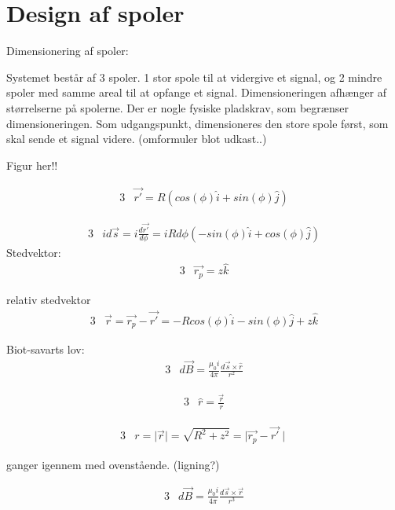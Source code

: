 \section{Design af spoler}\label{sec:sec_spole_design}

Dimensionering af spoler:

Systemet består af 3 spoler. 1 stor spole til at vidergive et signal, og 2 mindre spoler med samme areal til at opfange et signal. Dimensioneringen afhænger af størrelserne på spolerne. Der er nogle fysiske pladskrav, som begrænser dimensioneringen. Som udgangspunkt, dimensioneres den store spole først, som skal sende et signal videre. (omformuler blot udkast..)

Figur her!!

 \begin{alignat}{3}
 	&\vec{r'}=R(cos(\phi)\hat{i}+sin(\phi)\hat{j})
 \end{alignat}

\begin{alignat}{3}
	&id\vec{s}=i\frac{d\vec{r'}}{d\phi}=i R d\phi (-sin(\phi)\hat{i}+cos(\phi)\hat{j})
\end{alignat}
Stedvektor:
\begin{alignat}{3}
	&\vec{r_p}=z\hat{k}
\end{alignat}

relativ stedvektor
\begin{alignat}{3}
	&\vec{r}=\vec{r_p}-\vec{r'}=-R cos(\phi)\hat{i}-sin(\phi)\hat{j}+z\hat{k}
\end{alignat}

Biot-savarts lov:
\begin{alignat}{3}
	&d\vec{B}=\frac{\mu_0  i}{4\pi} \frac{d\vec{s} \times \hat{r}}{r^2}
\end{alignat}

\begin{alignat}{3}
	&\hat{r}=\frac{\vec{r}}{r}
\end{alignat}

\begin{alignat}{3}
	&r= \mid \vec{r} \mid = \sqrt{R^2+z^2}=\mid \vec{r_p}-\vec{r'} \mid
\end{alignat}



ganger igennem med ovenstående. (ligning?)

\begin{alignat}{3}
	&d\vec{B}=\frac{\mu_0 i}{4\pi} \frac{d\vec{s} \times \vec{r}}{r^3}
\end{alignat}

